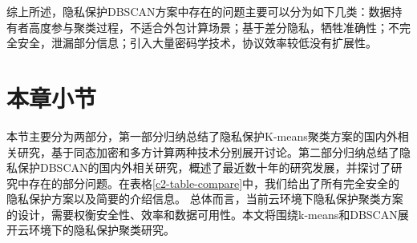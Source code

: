 综上所述，隐私保护DBSCAN方案中存在的问题主要可以分为如下几类：数据持有者高度参与聚类过程，不适合外包计算场景；基于差分隐私，牺牲准确性；不完全安全，泄漏部分信息；引入大量密码学技术，协议效率较低没有扩展性。

\section{本章小节}
本节主要分为两部分，第一部分归纳总结了隐私保护K-means聚类方案的国内外相关研究，基于同态加密和多方计算两种技术分别展开讨论。第二部分归纳总结了隐私保护DBSCAN的国内外相关研究，概述了最近数十年的研究发展，并探讨了研究中存在的部分问题。在表格\ref{c2-table-compare}中，我们给出了所有完全安全的隐私保护方案以及简要的介绍信息。
总体而言，当前云环境下隐私保护聚类方案的设计，需要权衡安全性、效率和数据可用性。本文将围绕k-means和DBSCAN展开云环境下的隐私保护聚类研究。

\begin{table}[htbp]
	\centering	
	\renewcommand{\arraystretch}{0.9}
	\caption{完全安全的隐私保护K-means和DBSCAN方案}
	\label{c2-table-compare}
\end{table}